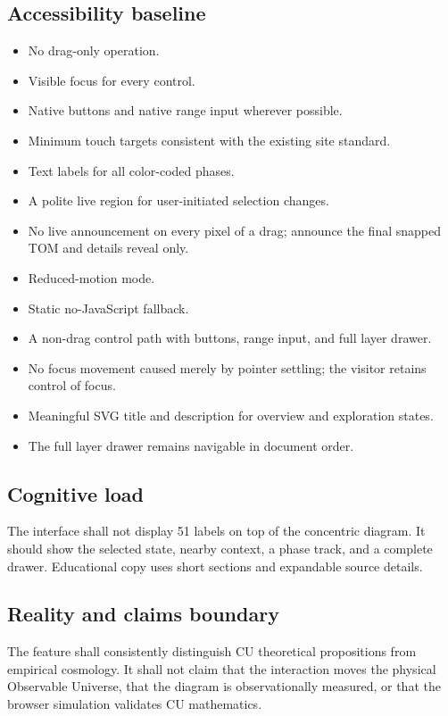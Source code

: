\documentclass[11pt,letterpaper]{article}
\begin{document}
\subsection{Accessibility baseline}
\begin{itemize}
\item No drag-only operation.
\item Visible focus for every control.
\item Native buttons and native range input wherever possible.
\item Minimum touch targets consistent with the existing site standard.
\item Text labels for all color-coded phases.
\item A polite live region for user-initiated selection changes.
\item No live announcement on every pixel of a drag; announce the final snapped TOM and details reveal only.
\item Reduced-motion mode.
\item Static no-JavaScript fallback.
\item A non-drag control path with buttons, range input, and full layer drawer.
\item No focus movement caused merely by pointer settling; the visitor retains control of focus.
\item Meaningful SVG title and description for overview and exploration states.
\item The full layer drawer remains navigable in document order.
\end{itemize}

\subsection{Cognitive load}
The interface shall not display 51 labels on top of the concentric diagram. It should show the selected state, nearby context, a phase track, and a complete drawer. Educational copy uses short sections and expandable source details.

\subsection{Reality and claims boundary}
The feature shall consistently distinguish CU theoretical propositions from empirical cosmology. It shall not claim that the interaction moves the physical Observable Universe, that the diagram is observationally measured, or that the browser simulation validates CU mathematics.
\end{document}
